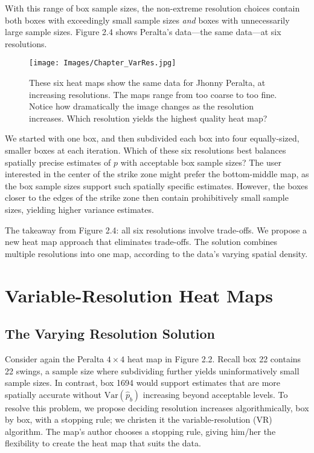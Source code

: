 With this range of box sample sizes, the non-extreme resolution choices contain both boxes with exceedingly small sample sizes {\it and} boxes with unnecessarily large sample sizes. Figure 2.4 shows Peralta's data---the same data---at six resolutions. 
        \begin{figure}[H]
      	\centering
      	\texttt{[image: Images/Chapter\_VarRes.jpg]} 
      	\caption{These six heat maps show the same data for Jhonny Peralta, at increasing resolutions. The maps range from too coarse to too fine. Notice how dramatically the image changes as the resolution increases. Which resolution yields the highest quality heat map?}
      	\end{figure} 
We started with one box, and then subdivided each box into four equally-sized, smaller boxes at each iteration. Which of these six resolutions best balances spatially precise estimates of $p$ with acceptable box sample sizes? The user interested in the center of the strike zone might prefer the bottom-middle map, as the box sample sizes support such spatially specific estimates. However, the boxes closer to the edges of the strike zone then contain prohibitively small sample sizes, yielding higher variance estimates. 

The takeaway from Figure 2.4: all six resolutions involve trade-offs. We propose a new heat map approach that eliminates trade-offs. The solution combines multiple resolutions into one map, according to the data's varying spatial density.

\section{Variable-Resolution Heat Maps} 

\subsection{The Varying Resolution Solution}

Consider again the Peralta $4 \times 4$ heat map in Figure 2.2. Recall box 22 contains 22 swings, a sample size where subdividing further yields uninformatively small sample sizes. In contrast, box 1694 would support estimates that are more spatially accurate without $\text{Var}(\hat{p}_{b})$ increasing beyond acceptable levels. To resolve this problem, we propose deciding resolution increases algorithmically, box by box, with a stopping rule; we christen it the variable-resolution (VR) algorithm. The map's author chooses a stopping rule, giving him/her the flexibility to create the heat map that suits the data. 

